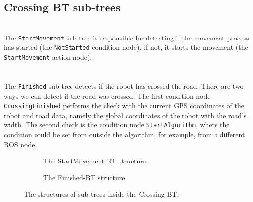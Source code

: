     \newpage
    \subsection{Crossing BT sub-trees}
        \\
        The \texttt{StartMovement} sub-tree is responsible for detecting if the movement process has started (the \texttt{NotStarted} condition node). If not, it starts the movement (the \texttt{StartMovement} action node).\\\\
        \\
        The \texttt{Finished} sub-tree detects if the robot has crossed the road. There are two ways we can detect if the road was crossed. The first condition node \texttt{CrossingFinished} performs the check with the current GPS coordinates of the robot and road data, namely the global coordinates of the robot with the road's width. The second check is the condition node \texttt{StartAlgorithm}, where the condition could be set from outside the algorithm, for example, from a different ROS node.\\
        \begin{figure}[ht]
            \begin{subfigure}{0.45\textwidth}
                \caption{The StartMovement-BT structure.}
                \label{fig:StartMovement-BT}
            \end{subfigure}
            \begin{subfigure}{0.54\textwidth}
                \caption{The Finished-BT structure.}
                \label{fig:Finished-BT}
            \end{subfigure}
            \caption{The structures of sub-trees inside the Crossing-BT.}
        \end{figure}
    